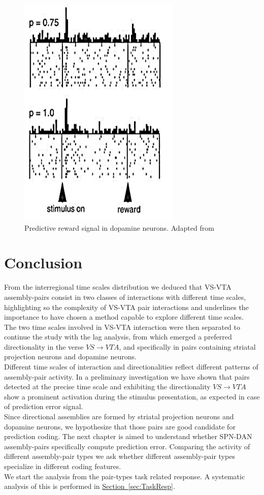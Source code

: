 \begin{figure}[h!]
    \centering
    \includegraphics{figures/RewPred1.png}
    \caption{Predictive reward signal in dopamine neurons. Adapted from \cite{Fiorillo}}
    \label{fig:RewPred}
\end{figure}
\pagebreak
\section{Conclusion}
From the interregional time scales distribution we deduced that VS-VTA assembly-pairs consist in two classes of interactions with different time scales, highlighting so the complexity of VS-VTA pair interactions and underlines the importance to have chosen a method capable to explore different time scales.\\The two time scales involved in VS-VTA interaction were then separated to continue the study with the lag analysis, from which emerged a preferred directionality in the verse $VS\rightarrow VTA$, and specifically in pairs containing striatal projection neurons and dopamine neurons.\\Different time scales of interaction and directionalities reflect different patterns of assembly-pair activity. In a preliminary investigation we have shown that pairs detected at the precise time scale and exhibiting the directionality $VS\rightarrow VTA$ show a prominent activation during the stimulus presentation, as expected in case of prediction error signal.\\Since directional assemblies are formed by striatal projection neurons and dopamine neurons, we hypothesize that those pairs are good candidate for prediction coding. The next chapter is aimed to understand whether SPN-DAN assembly-pairs specifically compute prediction error. Comparing the activity of different assembly-pair types we ask whether different assembly-pair types specialize in different coding features.\\We start the analysis from the pair-types task related response. A systematic analysis of this is performed in \hyperref[sec:TaskResp]{Section~\ref*{sec:TaskResp}}.

